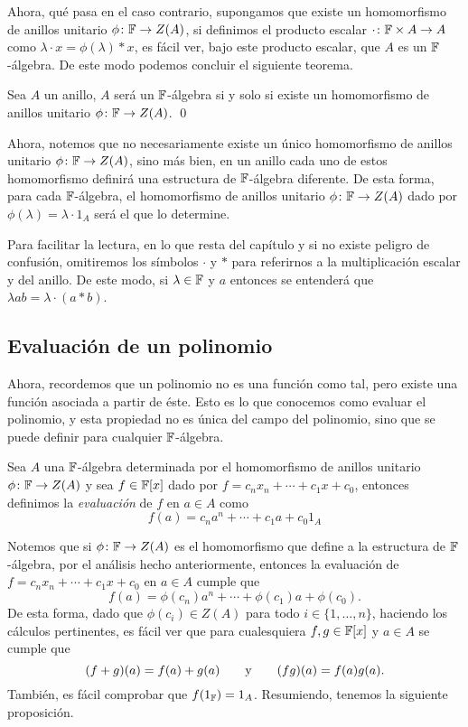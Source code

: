 Ahora, qué pasa en el caso contrario, supongamos que existe un homomorfismo de anillos unitario $\phi\colon \mathbb{F} \to Z(A)$, si definimos el producto escalar $\cdot \colon \mathbb{F}\times A \to A$ como $\lambda \cdot x = \phi(\lambda) * x$, es fácil ver, bajo este producto escalar, que $A$ es un $\mathbb{F}$-álgebra. De este modo podemos concluir el siguiente teorema.

\begin{teor}
  Sea $A$ un anillo, $A$ será un $\mathbb{F}$-álgebra si y solo si existe un homomorfismo de anillos unitario $\phi\colon \mathbb{F} \to Z(A)$. \qed
\end{teor}

Ahora, notemos que no necesariamente existe un único homomorfismo de anillos unitario $\phi\colon\mathbb{F}\to Z(A)$, sino más bien, en un anillo cada uno de estos homomorfismo definirá una estructura de $\mathbb{F}$-álgebra diferente. De esta forma, para cada $\mathbb{F}$-álgebra, el homomorfismo de anillos unitario $\phi\colon\mathbb{F}\to Z(A)$ dado por $\phi(\lambda) = \lambda \cdot 1_A$ será el que lo determine.

Para facilitar la lectura, en lo que resta del capítulo y si no existe peligro de confusión, omitiremos los símbolos $\cdot$ y $*$ para referirnos a la multiplicación escalar y del anillo. De este modo, si $\lambda \in \mathbb{F}$ y $a$ entonces se entenderá que $\lambda a b = \lambda \cdot (a * b) $.



\subsection{Evaluación de un polinomio}

Ahora, recordemos que un polinomio no es una función como tal, pero existe una función asociada a partir de éste. Esto es lo que conocemos como evaluar el polinomio, y esta propiedad no es única del campo del polinomio, sino que se puede definir para cualquier $\mathbb{F}$-álgebra.

\begin{defi}
  Sea $A$ una $\mathbb{F}$-álgebra determinada por el homomorfismo de anillos unitario $\phi\colon \mathbb{F}\to Z(A)$ y sea $f \in \mathbb{F}[x]$ dado por $f = c_n x_n + \cdots+ c_1x + c_0$, entonces definimos la \emph{evaluación} de $f$ en $a \in A$ como
  \[
    f(a) = c_n a^n + \cdots + c_1 a + c_0 1_A
  \]
\end{defi}

Notemos que si $\phi\colon \mathbb{F}\to Z(A)$ es el homomorfismo que define a la estructura de $\mathbb{F}$-álgebra, por el análisis hecho anteriormente, entonces la evaluación de $f = c_n x_n + \cdots+ c_1x + c_0$ en $a \in A$ cumple que
  \[
    f(a) = \phi(c_n) a^n + \cdots + \phi(c_1) a + \phi(c_0).
  \]
De esta forma, dado que $\phi(c_i) \in Z(A)$ para todo $i \in \{1,\ldots, n\}$, haciendo los cálculos pertinentes, es fácil ver que para cualesquiera $f, g \in \mathbb{F}[x]$ y $a \in A$ se cumple que
\[
  (f+g)(a) = f(a) + g(a)
    \qquad\text{y}\qquad
  (fg)(a) = f(a) g(a).
\]
También, es fácil  comprobar que $f(1_{\mathbb{F}}) = 1_A$. Resumiendo, tenemos la siguiente proposición.

